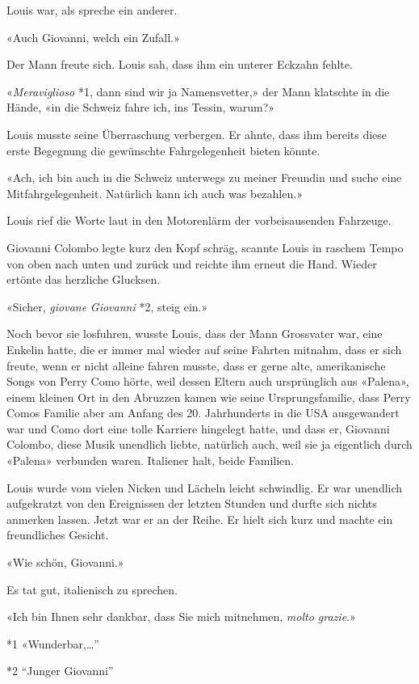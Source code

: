 Louis war, als spreche ein anderer.

«Auch Giovanni, welch ein Zufall.»

Der Mann freute sich. Louis sah, dass ihm ein unterer Eckzahn fehlte.

«\emph{Meraviglioso} *1, dann sind wir ja Namensvetter,» der Mann
klatschte in die Hände, «in die Schweiz fahre ich, ins Tessin, warum?»

Louis musste seine Überraschung verbergen. Er ahnte, dass ihm bereits
diese erste Begegnung die gewünschte Fahrgelegenheit bieten könnte.

«Ach, ich bin auch in die Schweiz unterwegs zu meiner Freundin und suche
eine Mitfahrgelegenheit. Natürlich kann ich auch was bezahlen.»

Louis rief die Worte laut in den Motorenlärm der vorbeisausenden
Fahrzeuge.

Giovanni Colombo legte kurz den Kopf schräg, scannte Louis in raschem
Tempo von oben nach unten und zurück und reichte ihm erneut die Hand.
Wieder ertönte das herzliche Glucksen.

«Sicher, \emph{giovane} \emph{Giovanni} *2, steig ein.»

Noch bevor sie losfuhren, wusste Louis, dass der Mann Grossvater war,
eine Enkelin hatte, die er immer mal wieder auf seine Fahrten mitnahm,
dass er sich freute, wenn er nicht alleine fahren musste, dass er gerne
alte, amerikanische Songs von Perry Como hörte, weil dessen Eltern auch
ursprünglich aus «Palena», einem kleinen Ort in den Abruzzen kamen wie
seine Ursprungsfamilie, dass Perry Comos Familie aber am Anfang des 20.
Jahrhunderts in die USA ausgewandert war und Como dort eine tolle
Karriere hingelegt hatte, und dass er, Giovanni Colombo, diese Musik
unendlich liebte, natürlich auch, weil sie ja eigentlich durch «Palena»
verbunden waren. Italiener halt, beide Familien.

Louis wurde vom vielen Nicken und Lächeln leicht schwindlig. Er war
unendlich aufgekratzt von den Ereignissen der letzten Stunden und durfte
sich nichts anmerken lassen. Jetzt war er an der Reihe. Er hielt sich
kurz und machte ein freundliches Gesicht.

«Wie schön, Giovanni.»

Es tat gut, italienisch zu sprechen.

«Ich bin Ihnen sehr dankbar, dass Sie mich mitnehmen, \emph{molto
grazie}.»

*1 «Wunderbar,\ldots''

*2 ``Junger Giovanni''

